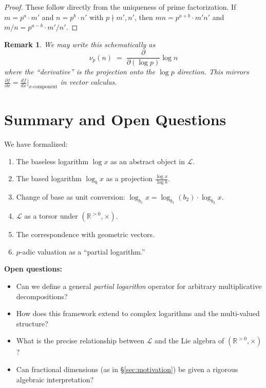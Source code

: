 \documentclass[11pt]{article}
\newtheorem{remark}[definition]{Remark}
\begin{document}
\begin{proof}
These follow directly from the uniqueness of prime factorization. If $m = p^a \cdot m'$ and $n = p^b \cdot n'$ with $p \nmid m', n'$, then $mn = p^{a+b} \cdot m'n'$ and $m/n = p^{a-b} \cdot m'/n'$.
\end{proof}

\begin{remark}
We may write this schematically as
\[
\nu_p(n) \;=\; \frac{\partial}{\partial (\log p)} \log n
\]
where the ``derivative'' is the projection onto the $\log p$ direction. This mirrors $\frac{\partial f}{\partial x} = \frac{df}{dx}\big|_{\text{$x$-component}}$ in vector calculus.
\end{remark}

\section{Summary and Open Questions}
\label{sec:summary}

We have formalized:
\begin{enumerate}
\item The baseless logarithm $\log x$ as an abstract object in $\mathcal{L}$.
\item The based logarithm $\log_b x$ as a projection $\frac{\log x}{\log b}$.
\item Change of base as unit conversion: $\log_{b_1} x = \log_{b_1}(b_2) \cdot \log_{b_2} x$.
\item $\mathcal{L}$ as a torsor under $(\mathbb{R}^{>0}, \times)$.
\item The correspondence with geometric vectors.
\item $p$-adic valuation as a ``partial logarithm.''
\end{enumerate}

\textbf{Open questions:}
\begin{itemize}
\item Can we define a general \emph{partial logarithm} operator for arbitrary multiplicative decompositions?
\item How does this framework extend to complex logarithms and the multi-valued structure?
\item What is the precise relationship between $\mathcal{L}$ and the Lie algebra of $(\mathbb{R}^{>0}, \times)$?
\item Can fractional dimensions (as in \S\ref{sec:motivation}) be given a rigorous algebraic interpretation?
\end{itemize}
\end{document}
